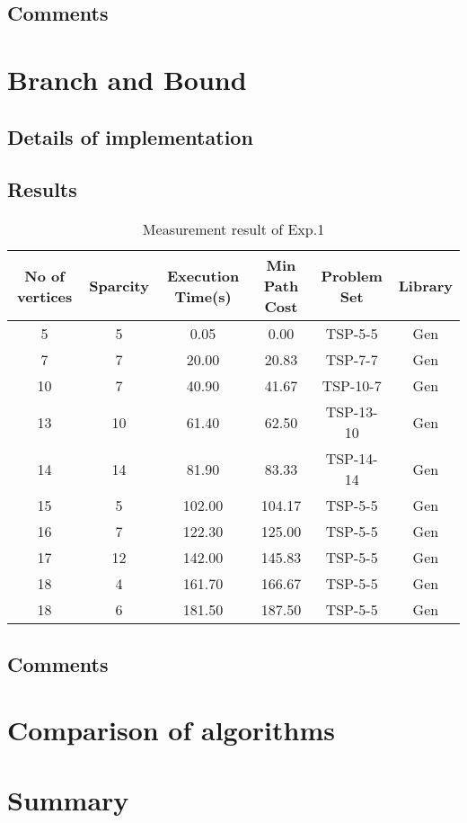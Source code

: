 \documentclass[a4paper, 11pt]{article}
\begin{document}
\subsection{Comments}
\pagebreak

\section{Branch and Bound}

\subsection{Details of implementation}

\subsection{Results}

\begin{table}[!h]
\centering
\begin{tabular}{|c|c|c|c|c|c|}
	\hline
	No of vertices & Sparcity  & Execution Time(s) & Min Path Cost & Problem Set & Library  \\
	\hline\hline
	5 & 5 & 0.05 & 0.00 & TSP-5-5 & Gen\\
	\hline
	7 & 7 & 20.00 &20.83& TSP-7-7 & Gen\\
	\hline
	10 & 7 & 40.90 &41.67& TSP-10-7 & Gen\\
	\hline
	13 & 10 & 61.40 &62.50& TSP-13-10 & Gen\\
	\hline
	14 & 14 & 81.90 &83.33& TSP-14-14 & Gen\\
	\hline
	15 & 5 & 102.00 &104.17& TSP-5-5 & Gen\\
	\hline
	16 & 7 & 122.30 &125.00& TSP-5-5 & Gen\\
	\hline
	17 & 12 & 142.00 &145.83& TSP-5-5 & Gen\\
	\hline
	18 & 4 & 161.70 &166.67& TSP-5-5 & Gen\\
	\hline
	18 & 6 & 181.50 &187.50& TSP-5-5 & Gen\\
	\hline
\end{tabular}
\caption{Measurement result of Exp.1}
\label{t1}
\end{table}


\subsection{Comments}
\pagebreak
\section{Comparison of algorithms}

\section{Summary}
\end{document}
